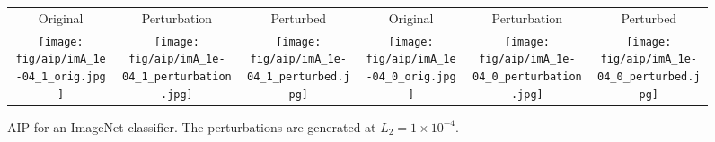\documentclass{article} %
\begin{document}
\begin{table}
\begin{centering}
\par\end{centering}
\vspace{0em}
\end{table}

\begin{figure}
\begin{centering}
\begin{tabular}{cccccc}
\setlength{\tabcolsep}{0.0em}
Original & Perturbation & Perturbed & Original & Perturbation & Perturbed\\
\texttt{[image: fig/aip/imA\_1e-04\_1\_orig.jpg]}
 & \hspace{-2em}
\texttt{[image: fig/aip/imA\_1e-04\_1\_perturbation.jpg]}
 \hspace{-2em} & 
\texttt{[image: fig/aip/imA\_1e-04\_1\_perturbed.jpg]}
&
\texttt{[image: fig/aip/imA\_1e-04\_0\_orig.jpg]}
 & \hspace{-2em}
\texttt{[image: fig/aip/imA\_1e-04\_0\_perturbation.jpg]}
 \hspace{-2em} &
\texttt{[image: fig/aip/imA\_1e-04\_0\_perturbed.jpg]}
\end{tabular}
\par\end{centering}
\caption{\label{fig:imagenet-aip-main}AIP for an ImageNet classifier. The perturbations are generated at $L_2=1\times 10^{-4}$.}
\end{figure}
\end{document}
